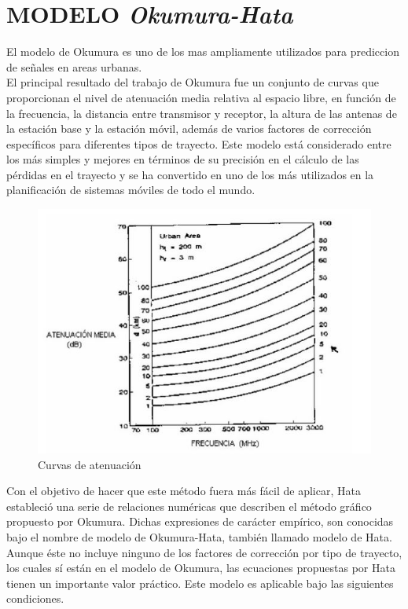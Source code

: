 \documentclass[conference, 9pt, a4paper]{IEEEtran}
\begin{document}
\section{MODELO \textit{Okumura-Hata}}
El modelo de Okumura es uno de los mas ampliamente utilizados para prediccion de señales en areas urbanas.\\
El principal resultado del trabajo de Okumura fue un conjunto de curvas que proporcionan el nivel de atenuación media relativa al espacio libre, en función de la frecuencia, la distancia entre transmisor y receptor, la altura de las antenas de la estación base y
la estación móvil, además de varios factores de corrección específicos para diferentes tipos de trayecto. Este modelo está considerado entre los más simples y mejores en términos de su precisión en el cálculo de las pérdidas en el trayecto y se ha convertido en uno de los más utilizados en la planificación de sistemas móviles de todo el mundo.

\begin{figure}
	\centering
	\includegraphics[width=\columnwidth]{image/okumura.JPG}
	\caption{Curvas de atenuación}
\end{figure}
Con el objetivo de hacer que este método fuera más fácil de aplicar, Hata estableció una serie de relaciones numéricas que describen el método gráfico propuesto por Okumura. Dichas expresiones de carácter empírico, son conocidas bajo el nombre de modelo de Okumura-Hata, también llamado modelo de Hata. Aunque éste no incluye ninguno de los factores de corrección por tipo de trayecto, los cuales sí están en el modelo de Okumura, las ecuaciones propuestas por Hata tienen un importante valor práctico. Este modelo es aplicable bajo las siguientes condiciones.
\end{document}
